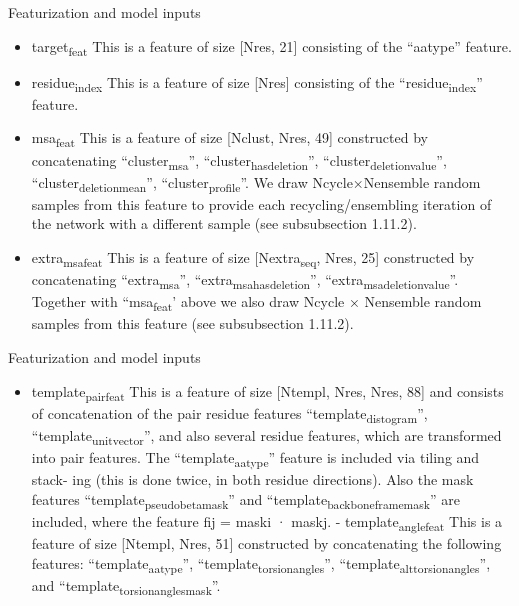 \documentclass[presentation, smaller]{beamer}
\begin{document}
\begin{frame}[label={sec:org90a183f}]{Featurization and model inputs \cite{jumperHighlyAccurateProtein2021}}
\begin{itemize}
\item \alert{target\textsubscript{feat}}
This is a feature of size [Nres, 21] consisting of the “aatype” feature.
\item \alert{residue\textsubscript{index}}
This is a feature of size [Nres] consisting of the “residue\textsubscript{index}” feature.
\item \alert{msa\textsubscript{feat}}
This is a feature of size [Nclust, Nres, 49] constructed by concatenating “cluster\textsubscript{msa}”, “cluster\textsubscript{has}\textsubscript{deletion}”, “cluster\textsubscript{deletion}\textsubscript{value}”, “cluster\textsubscript{deletion}\textsubscript{mean}”, “cluster\textsubscript{profile}”. We draw Ncycle×Nensemble random samples from this feature to provide each recycling/ensembling iteration of the network with a different sample (see subsubsection 1.11.2).
\item \alert{extra\textsubscript{msa}\textsubscript{feat}}
This is a feature of size [Nextra\textsubscript{seq}, Nres, 25] constructed by concatenating “extra\textsubscript{msa}”, “extra\textsubscript{msa}\textsubscript{has}\textsubscript{deletion}”, “extra\textsubscript{msa}\textsubscript{deletion}\textsubscript{value}”. Together with “msa\textsubscript{feat}’ above we also draw Ncycle × Nensemble random samples from this feature (see subsubsection 1.11.2).
\end{itemize}
\end{frame}
\begin{frame}[label={sec:orgeae81f8}]{Featurization and model inputs \cite{jumperHighlyAccurateProtein2021}}
\begin{itemize}
\item \alert{template\textsubscript{pair}\textsubscript{feat}}
This is a feature of size [Ntempl, Nres, Nres, 88] and consists of concatenation of the pair residue features “template\textsubscript{distogram}”, “template\textsubscript{unit}\textsubscript{vector}”, and also several residue features, which are transformed into pair features. The “template\textsubscript{aatype}” feature is included via tiling and stack- ing (this is done twice, in both residue directions). Also the mask features “template\textsubscript{pseudo}\textsubscript{beta}\textsubscript{mask}” and “template\textsubscript{backbone}\textsubscript{frame}\textsubscript{mask}” are included, where the feature fij = maski · maskj. - template\textsubscript{angle}\textsubscript{feat} This is a feature of size [Ntempl, Nres, 51] constructed by concatenating the following features: “template\textsubscript{aatype}”, “template\textsubscript{torsion}\textsubscript{angles}”, “template\textsubscript{alt}\textsubscript{torsion}\textsubscript{angles}”, and “template\textsubscript{torsion}\textsubscript{angles}\textsubscript{mask}”.
\end{itemize}
\end{frame}
\end{document}
